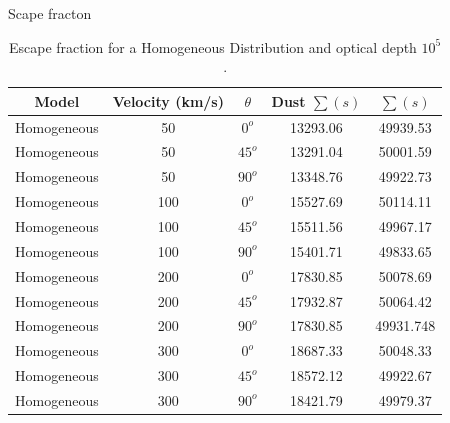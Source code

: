 \documentclass{article}
\theoremstyle{definition}
\theoremstyle{remark}
\begin{document}
Scape fracton\\

\begin{table}[H]
\begin{center}
\begin{tabular}{|c|c|c|c|c|}
\hline 
Model & Velocity (km/s) & $\theta$ & Dust $\sum (s)$& $\sum (s)$\\ 
\hline 
Homogeneous & 50 & $0^{o}$& 13293.06 &49939.53\\ 
\hline 
Homogeneous & 50 & $45^{o}$& 13291.04 &50001.59\\ 
\hline 
Homogeneous & 50 & $90^{o}$ & 13348.76 &49922.73\\ 
\hline 
Homogeneous & 100 & $0^{o}$ & 15527.69 &50114.11\\ 
\hline
Homogeneous & 100 & $45^{o}$ & 15511.56 &49967.17\\ 
\hline
Homogeneous & 100 & $90^{o}$ & 15401.71 & 49833.65\\ 
\hline 
Homogeneous & 200 & $0^{o}$  & 17830.85 & 50078.69\\ 
\hline 
Homogeneous & 200 & $45^{o}$ & 17932.87 & 50064.42\\ 
\hline 
Homogeneous & 200 & $90^{o}$ & 17830.85  & 49931.748\\ 
\hline
Homogeneous & 300 & $ 0^{o}$ & 18687.33 & 50048.33 \\ 
\hline 
Homogeneous & 300 & $45^{o}$ & 18572.12& 49922.67\\ 
\hline  
Homogeneous & 300 & $90^{o}$ & 18421.79 & 49979.37\\ 
\hline  
\end{tabular}
\caption{Escape fraction for a Homogeneous Distribution and optical depth $10^{5}$.} 
\end{center}
\end{table}
\end{document}
